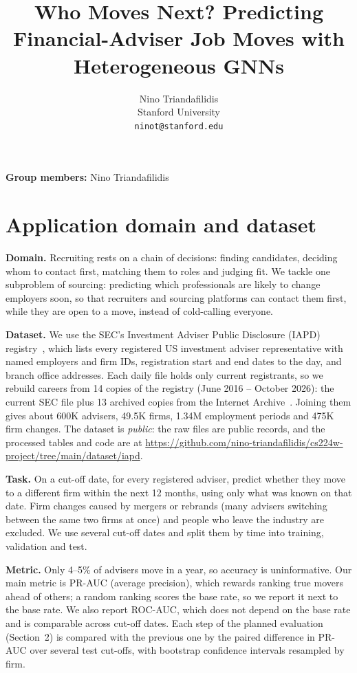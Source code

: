 \documentclass{article}
\title{Who Moves Next? Predicting Financial-Adviser Job Moves with Heterogeneous GNNs}
\author{%
  Nino Triandafilidis\\
  Stanford University\\
  \texttt{ninot@stanford.edu}
}
\begin{document}
\maketitle

\noindent\textbf{Group members:} Nino Triandafilidis

\section{Application domain and dataset}

\textbf{Domain.} Recruiting rests on a chain of decisions: finding candidates, deciding whom to contact first, matching them to roles and judging fit. We tackle one subproblem of sourcing: predicting which professionals are likely to change employers soon, so that recruiters and sourcing platforms can contact them first, while they are open to a move, instead of cold-calling everyone.

\textbf{Dataset.} We use the SEC's Investment Adviser Public Disclosure (IAPD) registry~\citep{sec_iapd}, which lists every registered US investment adviser representative with named employers and firm IDs, registration start and end dates to the day, and branch office addresses. Each daily file holds only current registrants, so we rebuild careers from 14 copies of the registry (June 2016 -- October 2026): the current SEC file plus 13 archived copies from the Internet Archive~\citep{wayback}. Joining them gives about 600K advisers, 49.5K firms, 1.34M employment periods and 475K firm changes. The dataset is \emph{public}: the raw files are public records, and the processed tables and code are at \url{https://github.com/nino-triandafilidis/cs224w-project/tree/main/dataset/iapd}.

\textbf{Task.} On a cut-off date, for every registered adviser, predict whether they move to a different firm within the next 12 months, using only what was known on that date. Firm changes caused by mergers or rebrands (many advisers switching between the same two firms at once) and people who leave the industry are excluded. We use several cut-off dates and split them by time into training, validation and test.

\textbf{Metric.} Only 4--5\% of advisers move in a year, so accuracy is uninformative. Our main metric is PR-AUC (average precision), which rewards ranking true movers ahead of others; a random ranking scores the base rate, so we report it next to the base rate. We also report ROC-AUC, which does not depend on the base rate and is comparable across cut-off dates. Each step of the planned evaluation (Section~2) is compared with the previous one by the paired difference in PR-AUC over several test cut-offs, with bootstrap confidence intervals resampled by firm.
\end{document}
